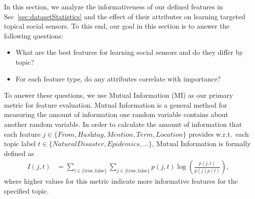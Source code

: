 In this section, we analyze the informativeness of our defined
features in Sec~\ref{sec:datasetStatistics} and the effect of their
attributes on learning targeted topical social sensors. To this end,
our goal in this section is to answer the following questions:
\begin{itemize}
\item What are the best features for learning social sensors and do they differ by topic?
\item For each feature type, do any attributes correlate with importance?
\end{itemize}
To answer these questions, we use Mutual Information (MI) as our primary
metric for feature evaluation.  Mutual Information is a general method
for measuring the amount of information one random variable contains
about another random variable.  In order to calculate the amount of
information that each feature
$j \in \{ \textit{From}, \textit{Hashtag}, \textit{Mention}, \textit{Term}, \textit{Location} \}$
provides w.r.t.\ each topic label $t \in \{NaturalDisaster, Epidemics,...\}$,
Mutual Information is formally defined as 
\begin{align*}
I(j, t) & = \!\!\! \sum_{t \in \{ \mathrm{true}, \mathrm{false} \}} \sum_{j \in \{ \mathrm{true}, \mathrm{false}\}}p(j,t)\log \left ( \frac{p(j,t)}{p(j)p(t)} \right ) , 
 \label{eq:eq1}
\end{align*}
where higher values for this metric indicate more informative features for the specified topic.

